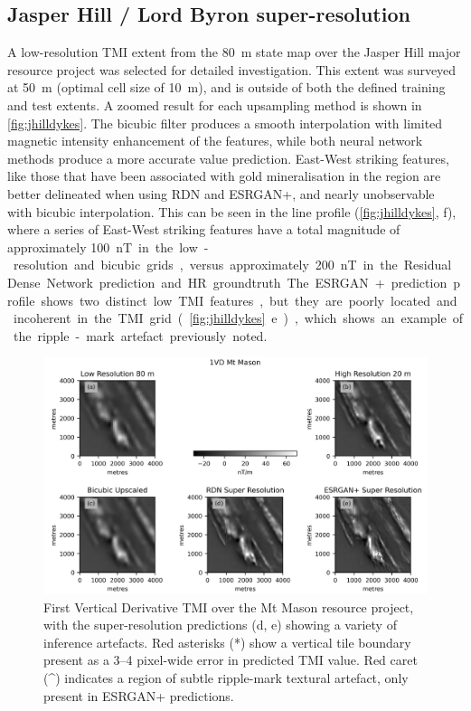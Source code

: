 \documentclass[manuscript.tex]{subfiles}
\begin{document}
\subsection{Jasper Hill / Lord Byron super-resolution}
A low-resolution TMI extent from the \SI{80}{\metre} state map over the Jasper Hill major resource project was selected for detailed investigation.
This extent was surveyed at \SI{50}{\metre} (optimal cell size of \SI{10}{\metre}), and is outside of both the defined training and test extents.
A zoomed result for each upsampling method is shown in \cref{fig:jhilldykes}.
The bicubic filter produces a smooth interpolation with limited magnetic intensity enhancement of the features, while both neural network methods produce a more accurate value prediction.
East-West striking features, like those that have been associated with gold mineralisation in the region \parencite[p.~283]{salierTimingSourceGoldbearing2003} are better delineated when using RDN\textdaggerdbl{} and ESRGAN+, and nearly unobservable with bicubic interpolation.
This can be seen in the line profile (\cref{fig:jhilldykes}, f), where a series of East-West striking features have a total magnitude of approximately \SI{100}nT in the low-resolution and bicubic grids, versus approximately \SI{200}nT in the Residual Dense Network prediction and HR groundtruth.
The ESRGAN+ prediction profile shows two distinct low TMI features, but they are poorly located and incoherent in the TMI grid (\cref{fig:jhilldykes} e), which shows an example of the ripple-mark artefact previously noted.

\begin{figure}[hbt]
    \includegraphics[width=\textwidth]{fig/p1/image10.png}
    \caption[First Vertical Derivative SR TMI over the Mt Mason resource project]{First Vertical Derivative TMI over the Mt Mason resource project, with the super-resolution predictions (d, e) showing a variety of inference artefacts.
    Red asterisks (*) show a vertical tile boundary present as a 3--4 pixel-wide error in predicted TMI value.
    Red caret (\^{ }) indicates a region of subtle ripple-mark textural artefact, only present in ESRGAN+ predictions.
    }
    \label{fig:jhillvis}
\end{figure}
\end{document}
